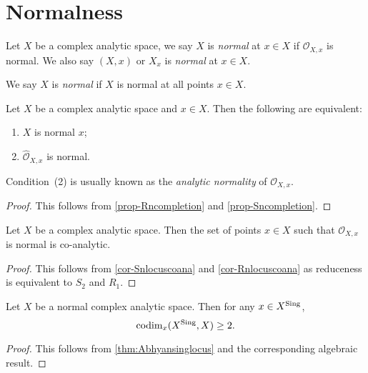 \section{Normalness}
\begin{definition}
    Let $X$ be a complex analytic space, we say $X$ is \emph{normal} at $x\in X$ if $\mathcal{O}_{X,x}$ is normal. We also say $(X,x)$ or $X_x$ is \emph{normal} at $x\in X$.

    We say $X$ is \emph{normal} if $X$ is normal at all points $x\in X$. 
\end{definition}
\begin{proposition}\label{prop-normalcompletion}
    Let $X$ be a complex analytic space and $x\in X$.  Then the following are equivalent:
    \begin{enumerate}
        \item $X$ is normal $x$;
        \item $\hat{\mathcal{O}}_{X,x}$ is normal.
    \end{enumerate}
\end{proposition}
Condition~(2) is usually known as the \emph{analytic normality} of $\mathcal{O}_{X,x}$. 
\begin{proof}
    This follows from \cref{prop-Rncompletion} and \cref{prop-Sncompletion}.
\end{proof}

\begin{thm}\label{thm-normallocusopen}
    Let $X$ be a complex analytic space. Then the set of points $x\in X$ such that $\mathcal{O}_{X,x}$ is normal is co-analytic.
\end{thm}
\begin{proof}
    This follows from \cref{cor-Snlocuscoana} and \cref{cor-Rnlocuscoana} as reduceness is equivalent to $S_2$ and $R_1$.
\end{proof}

\begin{proposition}\label{prop-normalspacesingcodim2}
    Let $X$ be a normal complex analytic space. Then for any $x\in X^{\operatorname{Sing}}$, 
    \[
        \operatorname{codim}_x(X^{\operatorname{Sing}},X)\geq 2.  
    \]
\end{proposition}
\begin{proof}
    This follows from \cref{thm:Abhyansinglocus} and the corresponding algebraic result.
\end{proof}

